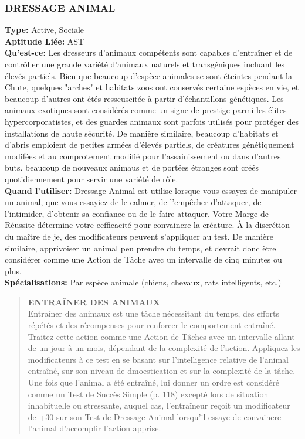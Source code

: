 \subsubsection{DRESSAGE ANIMAL} \textbf{Type:} Active, Sociale \\ \textbf{Aptitude Liée:} AST \\ \textbf{Qu'est-ce:} Les dresseurs d'animaux compétents sont capables d'entraîner et de contrôller une grande variété d'animaux naturels et transgéniques incluant les élevés partiels. Bien que beaucoup d'espèce animales se sont éteintes pendant la Chute, quelques "arches" et habitats zoos ont conservés certaine espèces en vie, et beaucoup d'autres ont étés resscuscitée à partir d'échantillons génétiques. Les animaux exotiques sont considérés comme un signe de prestige parmi les élites hypercorporatistes, et des guardes animaux sont parfois utilisés pour protéger des installations de haute sécurité. De manière similaire, beaucoup d'habitats et d'abris emploient de petites armées d'élevés partiels, de créatures génétiquement modifées et au comprotement modifié pour l'assainissement ou dans d'autres buts. beaucoup de nouveaux animaus et de portées étranges sont créés quotidiennement pour servir une variété de rôle. \\ \textbf{Quand l'utiliser:} Dressage Animal est utilise lorsque vous essayez de manipuler un animal, que vous essayiez de le calmer, de l'empêcher d'attaquer, de l'intimider, d'obtenir sa confiance ou de le faire attaquer. Votre Marge de Réussite détermine votre eefficacité pour convaincre la créature. À la discrétion du maître de je, des modificateurs peuvent s'appliquer au test. De manière similaire, apprivoiser un animal peu prendre du temps, et devrait donc être considérer comme une Action de Tâche avec un intervalle de cinq minutes ou plus. \\ \textbf{Spécialisations:} Par espèce animale (chiens, chevaux, rats intelligents, etc.) 

\begin{quotation} \textbf{ENTRAÎNER DES ANIMAUX} \\ Entraîner des animaux est une tâche nécessitant du temps, des efforts répétés et des récompenses pour renforcer le comportement entraîné. Traitez cette action comme une Action de Tâches avec un intervalle allant de un jour à un mois, dépendant de la complexité de l'action. Appliquez les modificateurs à ce test en se basant sur l'intelligence relative de l'animal entraîné, sur son niveau de dmoestication et sur la complexité de la tâche. Une fois que l'animal a été entraîné, lui donner un ordre est considéré comme un Test de Succès Simple (p. 118) excepté lors de situation inhabituelle ou stressante, auquel cas, l'entraîneur reçoit un modificateur de +30 sur son Test de Dressage Animal lorsqu'il essaye de convaincre l'animal d'accomplir l'action apprise. \end{quotation} 

